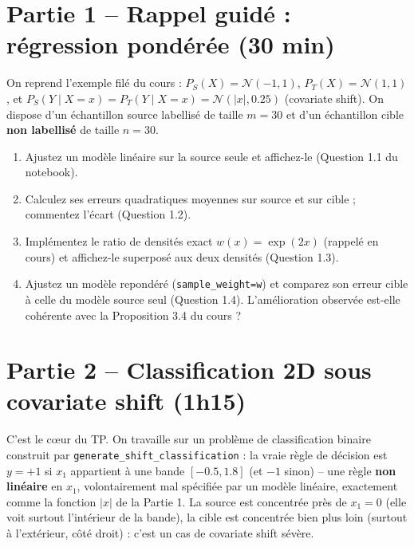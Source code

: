 \documentclass[11pt]{article}
\begin{document}
\section{Partie 1 -- Rappel guidé : régression pondérée (30 min)}

On reprend l'exemple filé du cours : $P_S(X)=\mathcal N(-1,1)$, $P_T(X)=\mathcal N(1,1)$, et
$P_S(Y\mid X=x)=P_T(Y\mid X=x)=\mathcal N(|x|,0.25)$ (covariate shift). On dispose d'un échantillon
source labellisé de taille $m=30$ et d'un échantillon cible \textbf{non labellisé} de taille
$n=30$.

\begin{enumerate}
\item Ajustez un modèle linéaire sur la source seule et affichez-le (Question 1.1 du notebook).
\item Calculez ses erreurs quadratiques moyennes sur source et sur cible ; commentez l'écart
(Question 1.2).
\item Implémentez le ratio de densités exact $w(x)=\exp(2x)$ (rappelé en cours) et affichez-le
superposé aux deux densités (Question 1.3).
\item Ajustez un modèle repondéré (\texttt{sample\_weight=w}) et comparez son erreur cible à celle
du modèle source seul (Question 1.4). L'amélioration observée est-elle cohérente avec la
Proposition 3.4 du cours ?
\end{enumerate}

\section{Partie 2 -- Classification 2D sous covariate shift (1h15)}

C'est le cœur du TP. On travaille sur un problème de classification binaire construit par
\texttt{generate\_shift\_classification} : la vraie règle de décision est $y=+1$ si $x_1$
appartient à une bande $[-0.5,1.8]$ (et $-1$ sinon) -- une règle \textbf{non linéaire} en $x_1$,
volontairement mal spécifiée par un modèle linéaire, exactement comme la fonction $|x|$ de la
Partie 1. La source est concentrée près de $x_1=0$ (elle voit surtout l'intérieur de la bande), la
cible est concentrée bien plus loin (surtout à l'extérieur, côté droit) : c'est un cas de covariate
shift sévère.
\end{document}
